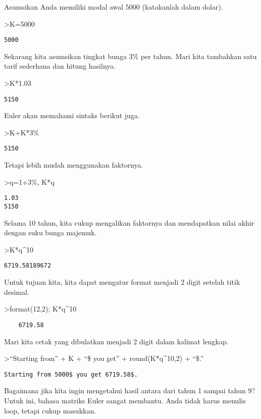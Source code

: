 \documentclass[
]{book}
\begin{document}
Asumsikan Anda memiliki modal awal 5000 (katakanlah dalam dolar).

\textgreater K=5000

\begin{verbatim}
5000
\end{verbatim}

Sekarang kita asumsikan tingkat bunga 3\% per tahun. Mari kita tambahkan satu tarif sederhana dan hitung hasilnya.

\textgreater K*1.03

\begin{verbatim}
5150
\end{verbatim}

Euler akan memahami sintaks berikut juga.

\textgreater K+K*3\%

\begin{verbatim}
5150
\end{verbatim}

Tetapi lebih mudah menggunakan faktornya.

\textgreater q=1+3\%, K*q

\begin{verbatim}
1.03
5150
\end{verbatim}

Selama 10 tahun, kita cukup mengalikan faktornya dan mendapatkan nilai akhir dengan suku bunga majemuk.

\textgreater K*q\^{}10

\begin{verbatim}
6719.58189672
\end{verbatim}

Untuk tujuan kita, kita dapat mengatur format menjadi 2 digit setelah titik desimal.

\textgreater format(12,2); K*q\^{}10

\begin{verbatim}
    6719.58 
\end{verbatim}

Mari kita cetak yang dibulatkan menjadi 2 digit dalam kalimat lengkap.

\textgreater{}``Starting from'' + K + ``\$ you get'' + round(K*q\^{}10,2) + ``\$.''

\begin{verbatim}
Starting from 5000$ you get 6719.58$.
\end{verbatim}

Bagaimana jika kita ingin mengetahui hasil antara dari tahun 1 sampai tahun 9? Untuk ini, bahasa matriks Euler sangat membantu. Anda tidak harus menulis loop, tetapi cukup masukkan.
\end{document}

